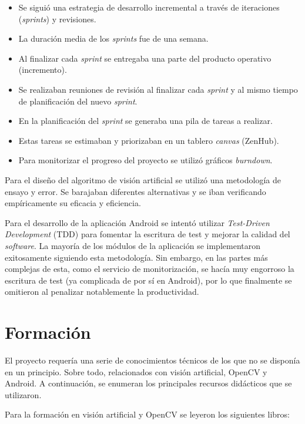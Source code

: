 \begin{itemize}
\tightlist
\item
  Se siguió una estrategia de desarrollo incremental a través de
  iteraciones (\emph{sprints}) y revisiones.
\item
  La duración media de los \emph{sprints} fue de una semana.
\item
  Al finalizar cada \emph{sprint} se entregaba una parte del producto
  operativo (incremento).
\item
  Se realizaban reuniones de revisión al finalizar cada \emph{sprint} y
  al mismo tiempo de planificación del nuevo \emph{sprint}.
\item
  En la planificación del \emph{sprint} se generaba una pila de tareas a
  realizar.
\item
  Estas tareas se estimaban y priorizaban en un tablero \emph{canvas}
  (ZenHub).
\item
  Para monitorizar el progreso del proyecto se utilizó gráficos
  \emph{burndown}.
\end{itemize}


Para el diseño del algoritmo de visión artificial se utilizó una
metodología de ensayo y error. Se barajaban diferentes alternativas y se
iban verificando empíricamente su eficacia y eficiencia.

Para el desarrollo de la aplicación Android se intentó utilizar
\emph{Test-Driven Development} (TDD) para fomentar la escritura de test
y mejorar la calidad del \emph{software}. La mayoría de los módulos de
la aplicación se implementaron exitosamente siguiendo esta metodología.
Sin embargo, en las partes más complejas de esta, como el servicio de
monitorización, se hacía muy engorroso la escritura de test (ya
complicada de por sí en Android), por lo que finalmente se omitieron al
penalizar notablemente la productividad.

\section{Formación}\label{formacion}

El proyecto requería una serie de conocimientos técnicos de los que no
se disponía en un principio. Sobre todo, relacionados con visión
artificial, OpenCV y Android. A continuación, se enumeran los
principales recursos didácticos que se utilizaron.

Para la formación en visión artificial y OpenCV se leyeron los
siguientes libros:

